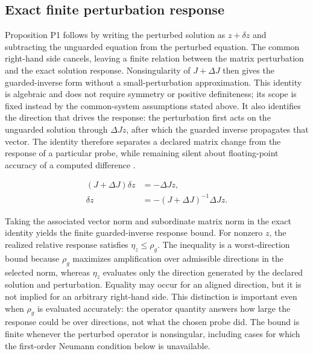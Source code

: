 \documentclass[preprint,12pt]{elsarticle}
\begin{document}
\subsection{Exact finite perturbation response}

Proposition P1 follows by writing the perturbed solution as $z + \delta z$ and subtracting the unguarded equation from the perturbed equation. The common right-hand side cancels, leaving a finite relation between the matrix perturbation and the exact solution response. Nonsingularity of $J + \Delta J$ then gives the guarded-inverse form without a small-perturbation approximation. This identity is algebraic and does not require symmetry or positive definiteness; its scope is fixed instead by the common-system assumptions stated above. It also identifies the direction that drives the response: the perturbation first acts on the unguarded solution through $\Delta J z$, after which the guarded inverse propagates that vector. The identity therefore separates a declared matrix change from the response of a particular probe, while remaining silent about floating-point accuracy of a computed difference \cite{S02,S03}.

\begin{linenomath*}
\begin{equation}
\begin{aligned}
(J+\Delta J)\delta z &= -\Delta J z,\\
\delta z &= -(J+\Delta J)^{-1}\Delta J z.
\end{aligned}
\label{eq:finite_response_identity}
\end{equation}
\end{linenomath*}

Taking the associated vector norm and subordinate matrix norm in the exact identity yields the finite guarded-inverse response bound. For nonzero $z$, the realized relative response satisfies $\eta_z \leq  \rho_g$. The inequality is a worst-direction bound because $\rho_g$ maximizes amplification over admissible directions in the selected norm, whereas $\eta_z$ evaluates only the direction generated by the declared solution and perturbation. Equality may occur for an aligned direction, but it is not implied for an arbitrary right-hand side. This distinction is important even when $\rho_g$ is evaluated accurately: the operator quantity answers how large the response could be over directions, not what the chosen probe did. The bound is finite whenever the perturbed operator is nonsingular, including cases for which the first-order Neumann condition below is unavailable.
\end{document}
